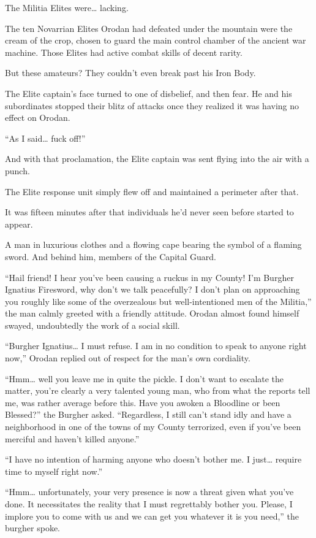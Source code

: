 \documentclass[a4paper,10pt]{book}
\begin{document}
The Militia Elites were… lacking.\par
The ten Novarrian Elites Orodan had defeated under the mountain were the cream of the crop, chosen to guard the main control chamber of the ancient war machine. Those Elites had active combat skills of decent rarity.\par
But these amateurs? They couldn’t even break past his Iron Body.\par
The Elite captain’s face turned to one of disbelief, and then fear. He and his subordinates stopped their blitz of attacks once they realized it was having no effect on Orodan.\par
“As I said… fuck off!”\par
And with that proclamation, the Elite captain was sent flying into the air with a punch.\par
The Elite response unit simply flew off and maintained a perimeter after that.\par
\par
It was fifteen minutes after that individuals he’d never seen before started to appear.\par
A man in luxurious clothes and a flowing cape bearing the symbol of a flaming sword. And behind him, members of the Capital Guard.\par
“Hail friend! I hear you’ve been causing a ruckus in my County! I’m Burgher Ignatius Firesword, why don’t we talk peacefully? I don’t plan on approaching you roughly like some of the overzealous but well-intentioned men of the Militia,” the man calmly greeted with a friendly attitude. Orodan almost found himself swayed, undoubtedly the work of a social skill.\par
“Burgher Ignatius… I must refuse. I am in no condition to speak to anyone right now,” Orodan replied out of respect for the man’s own cordiality.\par
“Hmm… well you leave me in quite the pickle. I don’t want to escalate the matter, you’re clearly a very talented young man, who from what the reports tell me, was rather average before this. Have you awoken a Bloodline or been Blessed?” the Burgher asked. “Regardless, I still can’t stand idly and have a neighborhood in one of the towns of my County terrorized, even if you’ve been merciful and haven’t killed anyone.”\par
“I have no intention of harming anyone who doesn’t bother me. I just… require time to myself right now.”\par
“Hmm… unfortunately, your very presence is now a threat given what you’ve done. It necessitates the reality that I must regrettably bother you. Please, I implore you to come with us and we can get you whatever it is you need,” the burgher spoke.\par
\end{document}
